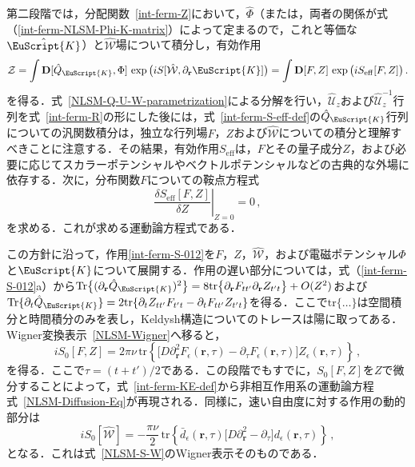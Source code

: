 \documentclass[a4paper,11pt]{ltjsarticle}
\def\Tr{\mathrm{Tr}}
\def\tr{\mathrm{tr}}
\def\D{\mathbf{D}}
\def\Qk{\hat{Q}_{\EuScript{K}}}
\begin{document}
第二段階では，分配関数~\eqref{int-ferm-Z}において，$\hat{\Phi}$（または，両者の関係が式（\ref{int-ferm-NLSM-Phi-K-matrix}）によって定まるので，これと等価な$\hat{\EuScript{K}}$）と$\hat{\mathcal{W}}$場について積分し，有効作用
\begin{equation}\label{int-ferm-S-eff-def}
\mathcal{Z}=\int\D[\hat Q_{\EuScript{K}},\Phi]\,
\exp\big(iS[\hat{\mathcal{W}},\partial_{\mathbf{r}}\EuScript{K}]\big)=\int\D[F,Z]\,
\exp\big(iS_{\mathrm{eff}}[F,Z]\big)\,.
\end{equation}
を得る．式~\eqref{NLSM-Q-U-W-parametrization}による分解を行い，$\hat{\mathcal{U}}_{z}$および$\hat{\mathcal{U}}^{-1}_{z}$行列を式~\eqref{int-ferm-R}の形にした後には，式~\eqref{int-ferm-S-eff-def}の$\hat Q_{\EuScript{K}}$行列についての汎関数積分は，独立な行列場$F$，$Z$および$\hat{\mathcal{W}}$についての積分と理解すべきことに注意する．その結果，有効作用$S_{\mathrm{eff}}$は，$F$とその量子成分$Z$，および必要に応じてスカラーポテンシャルやベクトルポテンシャルなどの古典的な外場に依存する．次に，分布関数$F$についての鞍点方程式
\begin{equation}\label{int-ferm-KE-def}
\left.\frac{\delta S_{\mathrm{eff}}[F,Z]}{\delta Z}\right|_{Z=0} =
0\,,
\end{equation}
を求める．これが求める運動論方程式である．

この方針に沿って，作用\eqref{int-ferm-S-012}を$F$，$Z$，$\hat{\mathcal{W}}$，および電磁ポテンシャル$\Phi$と$\EuScript{K}$について展開する．作用の遅い部分については，式（\ref{int-ferm-S-012}a）から$\Tr\big\{(\partial_{\mathbf{r}}
\Qk)^{2}\big\}=8\tr\big\{\partial_{\mathbf{r}}
F_{tt'}\partial_{\mathbf{r}} Z_{t't}\big\}+O(Z^{2})$および$\Tr\{\partial_{t}\Qk\}=2\mathrm{tr}\{\partial_{t}Z_{tt'}F_{t't}-
\partial_{t}F_{tt'}Z_{t't}\}$を得る．ここで$\tr\{\ldots\}$は空間積分と時間積分のみを表し，Keldysh構造についてのトレースは陽に取ってある．Wigner変換表示~\eqref{NLSM-Wigner}へ移ると，
\begin{equation}\label{int-ferm-S-0-FZ}
iS_{0}[F,Z]=2\pi\nu\,\tr\left\{\big[D\partial^{2}_{\mathbf{r}}F_{\epsilon}(\mathbf{r},\tau)-
\partial_{\tau}F_{\epsilon}(\mathbf{r},\tau)\big]Z_{\epsilon}(\mathbf{r},\tau)\right\}\,,
\end{equation}
を得る．ここで$\tau=(t+t')/2$である．この段階でもすでに，$S_{0}[F,Z]$を$Z$で微分することによって，式~\eqref{int-ferm-KE-def}から非相互作用系の運動論方程式~\eqref{NLSM-Diffusion-Eq}が再現される．同様に，速い自由度に対する作用の動的部分は
\begin{equation}\label{int-ferm-S-0-W}
iS_{0}[\hat{\mathcal{W}}]=-\frac{\pi\nu}{2}\,\tr\left\{\bar{d}_{\epsilon}(\mathbf{r},\tau)
\big[D\partial^{2}_{\mathbf{r}}-\partial_{\tau}\big]d_{\epsilon}(\mathbf{r},\tau)\right\}\,,
\end{equation}
となる．これは式~\eqref{NLSM-S-W}のWigner表示そのものである．
\end{document}

